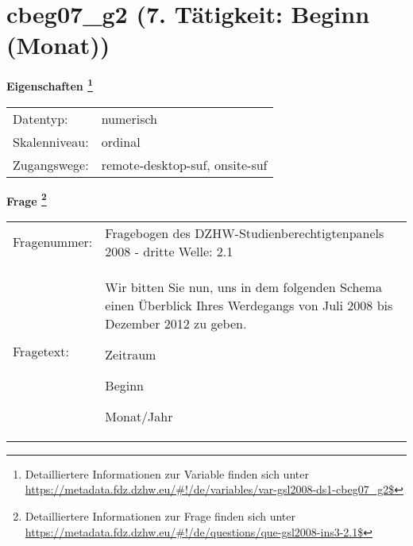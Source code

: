 
    \setcounter{footnote}{0}

    \vspace*{-1.8cm}
	\section{cbeg07\_g2 (7. Tätigkeit: Beginn (Monat))}
	\label{section:cbeg07_g2}



    \vspace*{0.5cm}
    \noindent\textbf{Eigenschaften
	\footnote{Detailliertere Informationen zur Variable finden sich unter
		\url{https://metadata.fdz.dzhw.eu/\#!/de/variables/var-gsl2008-ds1-cbeg07_g2$}}}\\
	\begin{tabularx}{\hsize}{@{}lX}
	Datentyp: & numerisch \\
	Skalenniveau: & ordinal \\
	Zugangswege: &
	  remote-desktop-suf, 
	  onsite-suf
 \\
    \end{tabularx}



				\vspace*{0.5cm}
                \noindent\textbf{Frage
	                \footnote{Detailliertere Informationen zur Frage finden sich unter
		              \url{https://metadata.fdz.dzhw.eu/\#!/de/questions/que-gsl2008-ins3-2.1$}}}\\
				\begin{tabularx}{\hsize}{@{}lX}
					Fragenummer: &
					  Fragebogen des DZHW-Studienberechtigtenpanels 2008 - dritte Welle:
					  2.1
 \\
					Fragetext: & Wir bitten Sie nun, uns in dem folgenden Schema einen Überblick Ihres Werdegangs von Juli 2008 bis Dezember 2012 zu geben.\par  Zeitraum\par  Beginn\par  Monat/Jahr \\
				\end{tabularx}





